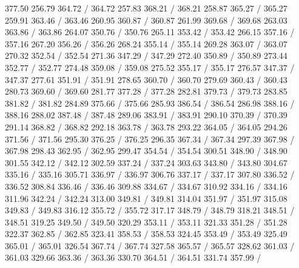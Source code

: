 { 377.50 256.79 364.72 /
 364.72 257.83 368.21 /
 368.21 258.87 365.27 /
 365.27 259.91 363.46 /
 363.46 260.95 360.87 /
 360.87 261.99 369.68 /
 369.68 263.03 363.86 /
 363.86 264.07 350.76 /
 350.76 265.11 353.42 /
 353.42 266.15 357.16 /
 357.16 267.20 356.26 /
 356.26 268.24 355.14 /
 355.14 269.28 363.07 /
 363.07 270.32 352.54 /
 352.54 271.36 347.29 /
 347.29 272.40 350.89 /
 350.89 273.44 352.77 /
 352.77 274.48 359.08 /
 359.08 275.52 355.17 /
 355.17 276.57 347.37 /
 347.37 277.61 351.91 /
 351.91 278.65 360.70 /
 360.70 279.69 360.43 /
 360.43 280.73 369.60 /
 369.60 281.77 377.28 /
 377.28 282.81 379.73 /
 379.73 283.85 381.82 /
 381.82 284.89 375.66 /
 375.66 285.93 386.54 /
 386.54 286.98 388.16 /
 388.16 288.02 387.48 /
 387.48 289.06 383.91 /
 383.91 290.10 370.39 /
 370.39 291.14 368.82 /
 368.82 292.18 363.78 /
 363.78 293.22 364.05 /
 364.05 294.26 371.56 /
 371.56 295.30 376.25 /
 376.25 296.35 367.34 /
 367.34 297.39 367.98 /
 367.98 298.43 362.95 /
 362.95 299.47 354.54 /
 354.54 300.51 348.90 /
 348.90 301.55 342.12 /
 342.12 302.59 337.24 /
 337.24 303.63 343.80 /
 343.80 304.67 335.16 /
 335.16 305.71 336.97 /
 336.97 306.76 337.17 /
 337.17 307.80 336.52 /
 336.52 308.84 336.46 /
 336.46 309.88 334.67 /
 334.67 310.92 334.16 /
 334.16 311.96 342.24 /
 342.24 313.00 349.81 /
 349.81 314.04 351.97 /
 351.97 315.08 349.83 /
 349.83 316.12 355.72 /
 355.72 317.17 348.79 /
 348.79 318.21 348.51 /
 348.51 319.25 349.50 /
 349.50 320.29 353.11 /
 353.11 321.33 351.28 /
 351.28 322.37 362.85 /
 362.85 323.41 358.53 /
 358.53 324.45 353.49 /
 353.49 325.49 365.01 /
 365.01 326.54 367.74 /
 367.74 327.58 365.57 /
 365.57 328.62 361.03 /
 361.03 329.66 363.36 /
 363.36 330.70 364.51 /
 364.51 331.74 357.99 /
}

